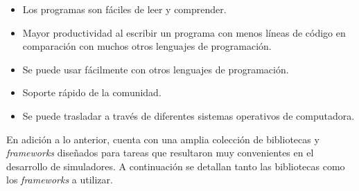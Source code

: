 \begin{itemize}
	\item Los programas son fáciles de leer y comprender.
	
	\item Mayor productividad al escribir un programa con menos líneas de código en comparación con muchos otros lenguajes de programación.
	
	\item Se puede usar fácilmente con otros lenguajes de programación.
	
	\item Soporte rápido de la comunidad.
	
	\item Se puede trasladar a través de diferentes sistemas operativos de computadora.
\end{itemize}

En adición a lo anterior, cuenta con una amplia colección de bibliotecas y \textit{frameworks} diseñados para tareas que resultaron muy convenientes en el desarrollo de simuladores. A continuación se detallan tanto las bibliotecas como los \textit{frameworks} a utilizar.

